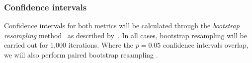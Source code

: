 \documentclass[11pt]{article}
\newcommand{\comment}[1]{\todo{#1}}
\begin{document}

%

\subsubsection{Confidence intervals}
Confidence intervals for both metrics will be calculated through the
\emph{bootstrap resampling} method~\citep{efron94} as described
by~\citet{koehn04}. %
In all cases, bootstrap resampling will
be carried out for 1,000 iterations. Where the $p = 0.05$ confidence
intervals overlap, we will also perform paired bootstrap resampling
\citep{koehn04}.
\end{document}
